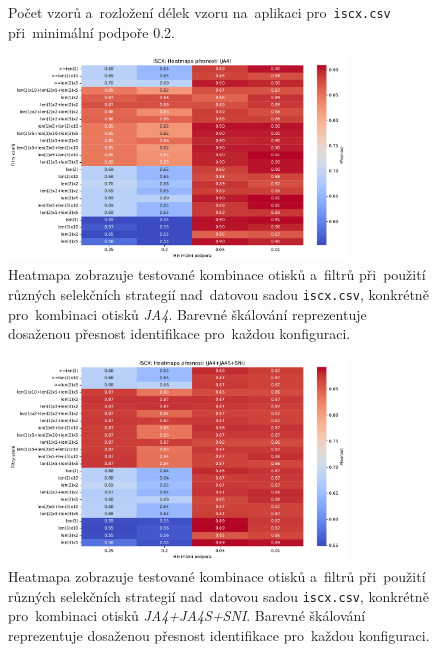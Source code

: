 \begin{figure}[H]
\begin{minipage}[t]{0.49\textwidth}
            \caption{Počet vzorů a~rozložení délek vzoru na~aplikaci pro~\texttt{iscx.csv} při~minimální podpoře 0.2.}
        \label{fig:appendix-}
    \end{minipage}
\end{figure}

\begin{figure}[H]
    \centering
     \includegraphics[angle=-90, width=0.8\textwidth]{obrazky-figures/exps/ex3-iscx-heatmap-JA4.pdf}
    \caption{Heatmapa zobrazuje testované kombinace otisků a~filtrů při~použití různých selekčních strategií nad~datovou sadou \texttt{iscx.csv}, konkrétně pro~kombinaci otisků \textit{JA4}. Barevné škálování reprezentuje dosaženou přesnost identifikace pro~každou konfiguraci.}
    \label{fig:appendix-heatmap-iscx-filter-ja4}
\end{figure}

\begin{figure}[H]
    \centering
    \includegraphics[angle=-90, width=0.8\textwidth]{obrazky-figures/exps/ex3-iscx-heatmap-JA4+JA4S+SNI.pdf}
    \caption{Heatmapa zobrazuje testované kombinace otisků a~filtrů při~použití různých selekčních strategií nad~datovou sadou \texttt{iscx.csv}, konkrétně pro~kombinaci otisků \textit{JA4+JA4S+SNI}. Barevné škálování reprezentuje dosaženou přesnost identifikace pro~každou konfiguraci.}
    \label{fig:appendix-heatmap-iscx-filter-ja4}
\end{figure}


